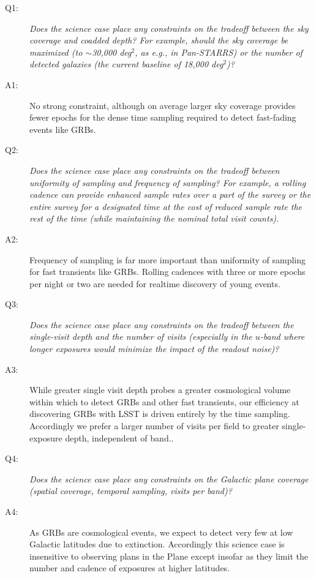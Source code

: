 \begin{description}

\item[Q1:] {\it Does the science case place any constraints on the
tradeoff between the sky coverage and coadded depth? For example, should
the sky coverage be maximized (to $\sim$30,000 deg$^2$, as e.g., in
Pan-STARRS) or the number of detected galaxies (the current baseline
of 18,000 deg$^2$)?}

\item[A1:] No strong constraint, although on average
	larger sky coverage provides fewer epochs for the dense time sampling
	required to detect fast-fading events like GRBs.

\item[Q2:] {\it Does the science case place any constraints on the
tradeoff between uniformity of sampling and frequency of  sampling? For
example, a rolling cadence can provide enhanced sample rates over a part
of the survey or the entire survey for a designated time at the cost of
reduced sample rate the rest of the time (while maintaining the nominal
total visit counts).}

\item[A2:]  Frequency of sampling is far more important than uniformity of
	sampling for fast transients like GRBs.  Rolling cadences with
		three or more epochs per night or two are needed for
		realtime discovery of young events.

\item[Q3:] {\it Does the science case place any constraints on the
tradeoff between the single-visit depth and the number of visits
(especially in the $u$-band where longer exposures would minimize the
impact of the readout noise)?}

\item[A3:]  While greater single visit depth probes a greater cosmological
	volume within which to detect GRBs and other fast transients,
		our efficiency at discovering
		GRBs with LSST is driven entirely by the time sampling.
		Accordingly we prefer a larger number of visits per field
		to greater single-exposure depth, independent of band..

\item[Q4:] {\it Does the science case place any constraints on the
Galactic plane coverage (spatial coverage, temporal sampling, visits per
band)?}

\item[A4:] As GRBs are cosmological events, we expect to detect very few at
	low Galactic latitudes due to extinction.  Accordingly this
		science case is insensitive to observing plans in the Plane
		except insofar as they limit the number and cadence of
		exposures at higher latitudes.


\end{description}
